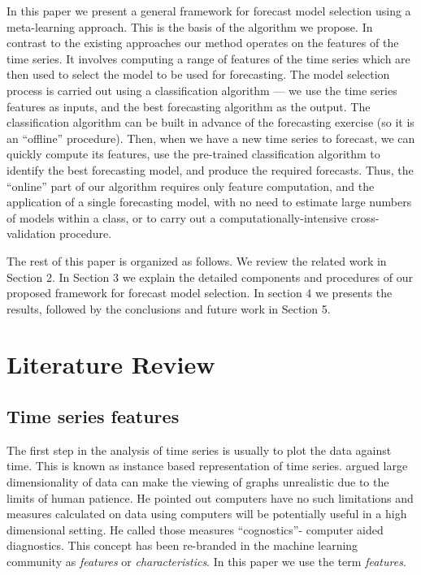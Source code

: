 \documentclass[11pt,a4paper,]{article}
\theoremstyle{definition}
\theoremstyle{definition}
\theoremstyle{definition}
\theoremstyle{remark}
\begin{document}
In this paper we present a general framework for forecast model
selection using a meta-learning approach. This is the basis of the
algorithm we propose. In contrast to the existing approaches our method
operates on the features of the time series. It involves computing a
range of features of the time series which are then used to select the
model to be used for forecasting. The model selection process is carried
out using a classification algorithm --- we use the time series features
as inputs, and the best forecasting algorithm as the output. The
classification algorithm can be built in advance of the forecasting
exercise (so it is an ``offline'' procedure). Then, when we have a new
time series to forecast, we can quickly compute its features, use the
pre-trained classification algorithm to identify the best forecasting
model, and produce the required forecasts. Thus, the ``online'' part of
our algorithm requires only feature computation, and the application of
a single forecasting model, with no need to estimate large numbers of
models within a class, or to carry out a computationally-intensive
cross-validation procedure.

The rest of this paper is organized as follows. We review the related
work in Section 2. In Section 3 we explain the detailed components and
procedures of our proposed framework for forecast model selection. In
section 4 we presents the results, followed by the conclusions and
future work in Section 5.

\section{Literature Review}\label{literature-review}

\subsection{Time series features}\label{time-series-features}

The first step in the analysis of time series is usually to plot the
data against time. This is known as instance based representation of
time series. \textcite{tukey1988computer} argued large dimensionality of
data can make the viewing of graphs unrealistic due to the limits of
human patience. He pointed out computers have no such limitations and
measures calculated on data using computers will be potentially useful
in a high dimensional setting. He called those measures ``cognostics''-
computer aided diagnostics. This concept has been re-branded in the
machine learning community as \emph{features} or \emph{characteristics}.
In this paper we use the term \emph{features}.
\end{document}

